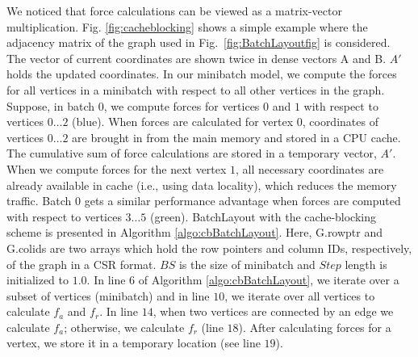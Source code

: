 \documentclass{vgtc}
\newcommand*{\myfont}{\fontfamily{lmtt}\selectfont}
\newcommand{\toolname}{{BatchLayout}}
\begin{document}

We noticed that force calculations can be viewed as a matrix-vector multiplication. 
Fig. \ref{fig:cacheblocking} shows a simple example where the adjacency matrix of the graph used in Fig.~\ref{fig:BatchLayoutfig} is considered.
The vector of current coordinates are shown twice in dense vectors A and B.
$A'$ holds the updated coordinates.
In our minibatch model,  we compute the forces for all vertices in a minibatch with respect to all other vertices in the graph.
Suppose, in batch $0$, we compute forces for vertices $0$ and $1$ with respect to vertices $0 \ldots 2$ (blue). When forces are calculated for vertex $0$, coordinates of vertices $0 \ldots 2$ are brought in from the main memory and stored in a CPU cache.
The cumulative sum of force calculations are stored in a temporary vector, $A'$. 
When we compute forces for the next vertex $1$, all necessary coordinates are already available in cache (i.e., using data locality), which reduces the memory traffic. Batch $0$ gets a similar performance advantage when forces are computed with respect to vertices $3\ldots 5$ (green). 
\toolname{} with the cache-blocking scheme is presented in Algorithm \ref{algo:cbBatchLayout}. 
Here, {\myfont G.rowptr} and {\myfont G.colids} are two arrays which hold the row pointers and column IDs, respectively, of the graph in a CSR format. 
$BS$ is the size of minibatch and $Step$ length is initialized to $1.0$. 
In line $6$ of Algorithm \ref{algo:cbBatchLayout}, we iterate over a subset of vertices (minibatch) and in line $10$, we iterate over all vertices to calculate $f_a$ and $f_r$. 
In line $14$, when two vertices are connected by an edge we calculate $f_a$; otherwise, we calculate $f_r$ (line $18$). After calculating forces for a vertex, we store it in a temporary location (see line $19$). 
\end{document}
